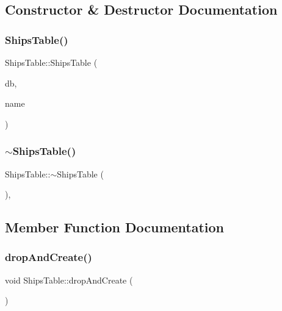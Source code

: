\subsection{Constructor \& Destructor Documentation}
\mbox{\label{class_ships_table_a3517ea91749252e3f28e1125d9e8a63a}} 
\subsubsection{\texorpdfstring{ShipsTable()}{ShipsTable()}}
{\footnotesize\ttfamily Ships\+Table\+::\+Ships\+Table (\begin{DoxyParamCaption}\item[{std\+::shared\+\_\+ptr$<$ sqlite\+::\+S\+Q\+Lite\+Storage $>$}]{db,  }\item[{std\+::string}]{name }\end{DoxyParamCaption})}

\mbox{\label{class_ships_table_a6e09c3aa5ce197a0f094a1908987b108}} 
\subsubsection{\texorpdfstring{$\sim$ShipsTable()}{~ShipsTable()}}
{\footnotesize\ttfamily Ships\+Table\+::$\sim$\+Ships\+Table (\begin{DoxyParamCaption}{ }\end{DoxyParamCaption})\hspace{0.3cm}{\ttfamily [default]}, {\ttfamily [noexcept]}}



\subsection{Member Function Documentation}
\mbox{\label{class_ships_table_a55bcab80359ce688ac530fb419965de3}} 
\subsubsection{\texorpdfstring{dropAndCreate()}{dropAndCreate()}}
{\footnotesize\ttfamily void Ships\+Table\+::drop\+And\+Create (\begin{DoxyParamCaption}{ }\end{DoxyParamCaption})}


